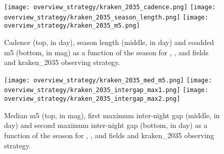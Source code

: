 \begin{figure}[htbp]
\begin{center}
  \texttt{[image: overview\_strategy/kraken\_2035\_cadence.png]}
  \texttt{[image: overview\_strategy/kraken\_2035\_season\_length.png]}
  \texttt{[image: overview\_strategy/kraken\_2035\_m5.png]}
 \caption{Cadence (top, in day), season length (middle, in day) and coadded m5 (bottom, in mag) as a function of the season for \ddfa, \ddfb, \ddfb and \ddfd fields and kraken\_2035 observing strategy.}\label{fig:kraken_cad}
\end{center}
\end{figure}

\begin{figure}[htbp]
\begin{center}
  
  \texttt{[image: overview\_strategy/kraken\_2035\_med\_m5.png]}
  \texttt{[image: overview\_strategy/kraken\_2035\_intergap\_max1.png]}
    \texttt{[image: overview\_strategy/kraken\_2035\_intergap\_max2.png]}
    \caption{Median m5 (top, in mag), first maximum inter-night gap (middle, in day) and second maximum inter-night gap (bottom, in day)  as a function of the season for \ddfa, \ddfb, \ddfb and \ddfd fields and kraken\_2035 observing strategy.}\label{fig:kraken_m5}
\end{center}
\end{figure}
